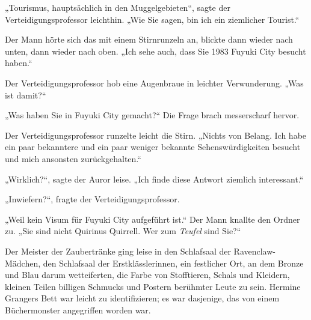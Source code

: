 „Tourismus, hauptsächlich in den Muggelgebieten“, sagte der Verteidigungsprofessor leichthin. „Wie Sie sagen, bin ich ein ziemlicher Tourist.“

Der Mann hörte sich das mit einem Stirnrunzeln an, blickte dann wieder nach unten, dann wieder nach oben. „Ich sehe auch, dass Sie 1983 Fuyuki City besucht haben.“

Der Verteidigungsprofessor hob eine Augenbraue in leichter Verwunderung. „Was ist damit?“

„Was haben Sie in Fuyuki City gemacht?“ Die Frage brach messerscharf hervor.

Der Verteidigungsprofessor runzelte leicht die Stirn. „Nichts von Belang. Ich habe ein paar bekanntere und ein paar weniger bekannte Sehenswürdigkeiten besucht und mich ansonsten zurückgehalten.“

„Wirklich?“, sagte der Auror leise. „Ich finde diese Antwort ziemlich interessant.“

„Inwiefern?“, fragte der Verteidigungsprofessor.

„Weil kein Visum für Fuyuki City aufgeführt ist.“
Der Mann knallte den Ordner zu.
„Sie sind nicht Quirinus Quirrell. Wer zum \emph{Teufel} sind Sie?“

\later

Der Meister der Zaubertränke ging leise in den Schlafsaal der Ravenclaw-Mädchen, den Schlafsaal der Erstklässlerinnen, ein festlicher Ort, an dem Bronze und Blau darum wetteiferten, die Farbe von Stofftieren, Schals und Kleidern, kleinen Teilen billigen Schmucks und Postern berühmter Leute zu sein. Hermine Grangers Bett war leicht zu identifizieren; es war dasjenige, das von einem Büchermonster angegriffen worden war.

